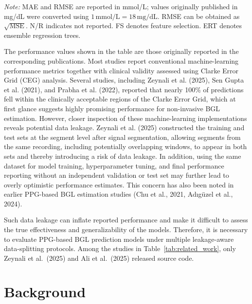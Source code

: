 \documentclass{article}
\begin{document}
\begin{table}[H]
{\begin{tabular}{lclclcccccc}
\bottomrule
\end{tabular}%
}

\vspace{2pt}

\begin{minipage}{\columnwidth}
\scriptsize
\textit{Note:} MAE and RMSE are reported in mmol/L; values originally published in mg/dL were converted using $1\,\mathrm{mmol/L}=18\,\mathrm{mg/dL}$. 
RMSE can be obtained as $\sqrt{\mathrm{MSE}}$.
N/R indicates not reported. 
FS denotes feature selection. 
ERT denotes ensemble regression trees.
\end{minipage}

\end{table}

The performance values shown in the table are those originally reported in the corresponding publications. Most studies report conventional machine-learning performance metrics together with clinical validity assessed using Clarke Error Grid (CEG) analysis. Several studies, including Zeynali et al. (2025), Sen Gupta et al. (2021), and Prabha et al. (2022), reported that nearly 100\% of predictions fell within the clinically acceptable regions of the Clarke Error Grid, which at first glance suggests highly promising performance for non-invasive BGL estimation. However, closer inspection of these machine-learning implementations reveals potential data leakage. Zeynali et al. (2025) constructed the training and test sets at the segment level after signal segmentation, allowing segments from the same recording, including potentially overlapping windows, to appear in both sets and thereby introducing a risk of data leakage. In addition, using the same dataset for model training, hyperparameter tuning, and final performance reporting without an independent validation or test set may further lead to overly optimistic performance estimates. This concern has also been noted in earlier PPG-based BGL estimation studies (Chu et al., 2021, Ad{\i}g{\"u}zel et al., 2024).

Such data leakage can inflate reported performance and make it difficult to assess the true effectiveness and generalizability of the models. Therefore, it is necessary to evaluate PPG-based BGL prediction models under multiple leakage-aware data-splitting protocols. Among the studies in Table~\ref{tab:related_work}, only Zeynali et al.\ (2025) and Ali et al.\ (2025) released source code.



\section{Background}
\end{document}
